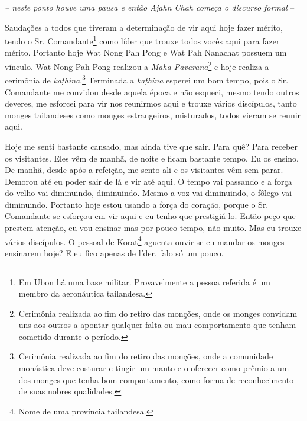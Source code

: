 {\itshape
-- neste ponto houve uma pausa e então Ajahn Chah começa o discurso
formal} --

Saudações a todos que tiveram a determinação de vir aqui hoje fazer
mérito, tendo o Sr. Comandante\footnote{Em Ubon há uma base militar.
Provavelmente a pessoa referida é um membro da aeronáutica tailandesa.
} como líder que trouxe todos vocês aqui para fazer mérito. Portanto
hoje Wat Nong Pah Pong e Wat Pah Nanachat possuem um vínculo. Wat Nong
Pah Pong realizou a \textit{Mahā-Pavāranā}\footnote{Cerimônia
realizada ao fim do retiro das monções, onde os monges convidam uns aos
outros a apontar qualquer falta ou mau comportamento que tenham
cometido durante o período.} e hoje realiza a cerimônia de
\textit{kaṭhina}.\footnote{Cerimônia realizada ao fim do retiro das
monções, onde a comunidade monástica deve costurar e tingir um manto e
o oferecer como prêmio a um dos monges que tenha bom comportamento,
como forma de reconhecimento de suas nobres qualidades.} Terminada a
\textit{kaṭhina} esperei um bom tempo, pois o Sr. Comandante me
convidou desde aquela época e não esqueci, mesmo tendo outros deveres,
me esforcei para vir nos reunirmos aqui e trouxe vários discípulos,
tanto monges tailandeses como monges estrangeiros, misturados, todos
vieram se reunir aqui. 

Hoje me senti bastante cansado, mas ainda tive que sair. Para quê?
Para receber os visitantes. Eles vêm de manhã, de noite e ficam
bastante tempo. Eu os ensino. De manhã, desde após a refeição, me sento
ali e os visitantes vêm sem parar. Demorou até eu poder sair de lá e
vir até aqui. O tempo vai passando e a força do velho vai diminuindo,
diminuindo. Mesmo a voz vai diminuindo, o fôlego vai diminuindo.
Portanto hoje estou usando a força do coração, porque o Sr. Comandante
se esforçou em vir aqui e eu tenho que prestigiá-lo. Então peço que
prestem atenção, eu vou ensinar mas por pouco tempo, não muito. Mas eu
trouxe vários discípulos. O pessoal de Korat\footnote{Nome de uma
província tailandesa.} aguenta ouvir se eu mandar os monges ensinarem
hoje? E eu fico apenas de líder, falo só um pouco. 

